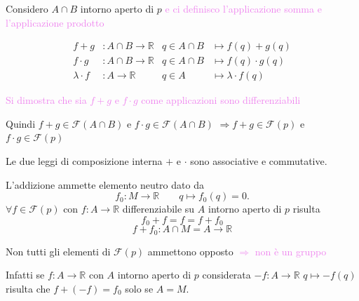         Considero $A \cap B$ intorno aperto di $p$ \textcolor{violet}{e ci definisco l'applicazione somma e l'applicazione prodotto}

        \begin{align*}
        f + g &: A \cap B \to \mathbb{R} & q \in A \cap B &\longmapsto f(q) + g(q) \\
        f \cdot g &: A \cap B \to \mathbb{R} & q \in A \cap B &\longmapsto f(q) \cdot g(q) \\
        \lambda \cdot f &: A \to \mathbb{R} & q \in A &\longmapsto \lambda \cdot f(q)
        \end{align*}

        \textcolor{violet}{Si dimostra che sia $f+g$ e $f \cdot g$ come applicazioni sono differenziabili}

        Quindi $f+g \in \mathcal{F}(A \cap B)$ e $f \cdot g \in \mathcal{F}(A \cap B)$
        $\Rightarrow f+g \in \mathcal{F}(p)$ e $f \cdot g \in \mathcal{F}(p)$

        Le due leggi di composizione interna $+$ e $\cdot$ sono associative e commutative.

        L'addizione ammette elemento neutro dato da
        \[
        f_0 : M \to \mathbb{R} \qquad q \longmapsto f_0(q) = 0.
        \]
        $\forall f \in \mathcal{F}(p)$ con $f : A \to \mathbb{R}$ differenziabile su $A$ intorno aperto di $p$ risulta
        \[ f_0 + f = f = f + f_0 \]
        \[ f + f_0 \colon A \cap M = A \to \mathbb{R} \]

        Non tutti gli elementi di $\mathcal{F}(p)$ ammettono opposto \textcolor{violet}{$\Rightarrow$ non è un gruppo}

        \textcolor{verde}{Infatti se $f : A \to \mathbb{R}$ con $A$ intorno aperto di $p$ considerata 
        $-f : A \to \mathbb{R}$ $q \longmapsto -f(q)$ risulta che $f + (-f) = f_0$ solo se $A = M$.}

